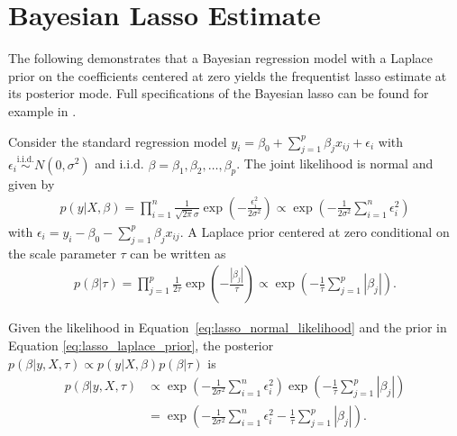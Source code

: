 \section{Bayesian Lasso Estimate}
\label{app:bayesian_lasso_estimate}
The following demonstrates that a Bayesian regression model with a Laplace prior on the coefficients centered at zero yields the frequentist lasso estimate at its posterior mode. Full specifications of the Bayesian lasso can be found for example in \textcite{yuan_efficient_2005,park_bayesian_2008,figueiredo_adaptive_2003}.

Consider the standard regression model $y_i = \beta_0 + \sum_{j = 1}^{p} \beta_j x_{ij} + \epsilon_i$ with $\epsilon_i \overset{\text{i.i.d.}}{\sim} N(0, \sigma^2)$ and i.i.d. $\beta = \beta_1 , \beta_2 , \dots , \beta_p$. The joint likelihood is normal and given by
\begin{align}
    \label{eq:lasso_normal_likelihood}
    p(y|X,\beta) = \prod_{i = 1}^{n} \frac{1}{\sqrt{2 \pi} \sigma} \exp \left( - \frac{\epsilon_i^2}{2 \sigma^2} \right) \propto \exp \left( - \frac{1}{2 \sigma^2} \sum_{i = 1}^{n} \epsilon_i^2 \right)
\end{align}
with $\epsilon_i = y_i - \beta_0 - \sum_{j = 1}^{p} \beta_j x_{ij}$. A Laplace prior centered at zero conditional on the scale parameter $\tau$ can be written as
\begin{align}
    \label{eq:lasso_laplace_prior}
    p(\beta | \tau) = \prod_{j = 1}^{p} \frac{1}{2 \tau} \exp \left( - \frac{| \beta_j |}{\tau} \right) \propto \exp \left( - \frac{1}{\tau} \sum_{j = 1}^{p} |\beta_j| \right) \text{.}
\end{align}

Given the likelihood in Equation~\eqref{eq:lasso_normal_likelihood} and the prior in Equation \eqref{eq:lasso_laplace_prior}, the posterior $p(\beta | y , X , \tau) \propto p(y|X,\beta) p(\beta | \tau)$ is
\begin{align}
    \label{eq:lasso_posterior}
    p(\beta | y , X , \tau) & \propto \exp \left( - \frac{1}{2 \sigma^2} \sum_{i = 1}^{n} \epsilon_i^2 \right) \exp \left( - \frac{1}{\tau} \sum_{j = 1}^{p} |\beta_j| \right) \nonumber \\
                 & = \exp \left( - \frac{1}{2 \sigma^2} \sum_{i = 1}^{n} \epsilon_i^2 - \frac{1}{\tau} \sum_{j = 1}^{p} |\beta_j| \right) \text{.}
\end{align}

